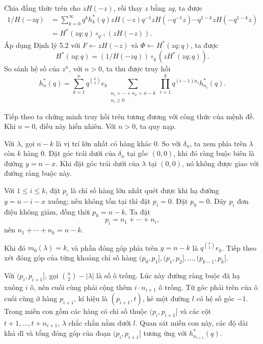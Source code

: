 \documentclass[11pt]{article}
\begin{document}
\paragraph{}
Chia đẳng thức trên cho \(zH(-z)\), rồi thay \(z\) bằng \(zq\), ta được
\[
\begin{aligned}
  1/H(-zq)
  &=
  \sum_{k=0}^{\infty}
  q^kh^*_k(q)zH(-z)q^{-1}zH(-q^{-1}z)\cdots q^{1-k}zH(-q^{1-k}z) \\
  &=
  H^*(zq;q)\circ_{q^{-1}}(zH(-z)).
\end{aligned}
\]
Áp dụng Định lý 5.2 với \(F\leftarrow zH(-z)\) và
\(\Phi\leftarrow H^*(zq;q)\), ta được
\[
  H^*(zq;q)=(1/H(-zq))\circ_q(zH^*(zq;q)).
\]
So sánh hệ số của \(z^n\), với \(n>0\), ta thu được truy hồi
\[
  h^*_n(q)
  =
  \sum_{k=1}^{n}q^{\binom{k}{2}}e_k
  \sum_{\substack{n_1+\cdots+n_k=n-k\\ n_i\ge0}}
  \prod_{i=1}^{k}q^{(i-1)n_i}h^*_{n_i}(q).
\]

Tiếp theo ta chứng minh truy hồi trên tương đương với công thức của mệnh đề.
Khi \(n=0\), điều này hiển nhiên. Với \(n>0\), ta quy nạp.

Với \(\lambda\), gọi \(n-k\) là vị trí lớn nhất có hàng khác \(0\). So với
\(\delta_n\), ta xem phía trên \(\lambda\) còn \(k\) hàng \(0\). Đặt góc trái
dưới của \(\delta_n\) tại gốc \((0,0)\), khi đó ràng buộc biên là đường
\(y=n-x\). Khi đặt góc trái dưới của \(\lambda\) tại \((0,0)\), nó không được
giao với đường ràng buộc này.

Với \(1\le i\le k\), đặt \(p_i\) là chỉ số hàng lớn nhất quét được khi hạ
đường \(y=n-i-x\) xuống; nếu không tồn tại thì đặt \(p_i=0\). Đặt \(p_0=0\).
Dãy \(p_i\) đơn điệu không giảm, đồng thời \(p_k=n-k\). Ta đặt
\[
  p_i=n_1+\cdots+n_i,
\]
nên \(n_1+\cdots+n_k=n-k\).

Khi đó \(m_0(\lambda)=k\), và phần đóng góp phía trên \(y=n-k\) là
\(q^{\binom{k}{2}}e_k\). Tiếp theo xét đóng góp của từng khoảng chỉ số hàng
\((p_0,p_1],(p_1,p_2],\ldots,(p_{k-1},p_k]\).

Với \((p_i,p_{i+1}]\), gọi \(\binom{n}{2}-|\lambda|\) là số ô trống. Lúc này
đường ràng buộc đã hạ xuống \(i\) ô, nên cuối cùng phải cộng thêm
\(i\cdot n_{i+1}\) ô trống. Từ góc phải trên của ô cuối cùng ở hàng
\(p_{i+1}\), kí hiệu là \((p_{i+1},t)\), kẻ một đường \(l\) có hệ số góc
\(-1\). Trong miền con gồm các hàng có chỉ số thuộc \((p_i,p_{i+1}]\) và các
cột \(t+1,\ldots,t+n_{i+1}\), \(\lambda\) chắc chắn nằm dưới \(l\). Quan sát
miền con này, các độ dài khả dĩ và tổng đóng góp của đoạn \((p_i,p_{i+1}]\)
tương ứng với \(h^*_{n_{i+1}}(q)\).
\end{document}
